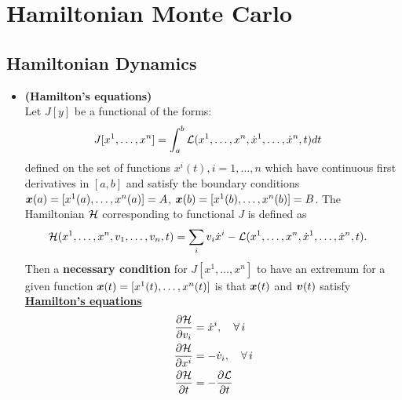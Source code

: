 \documentclass[11pt]{article}
\begin{document}
\section{Hamiltonian Monte Carlo}
\subsection{Hamiltonian Dynamics}
\begin{itemize}
\item \begin{theorem} \textbf{(Hamilton's equations)}  \citep{gelfand2000calculus}\\
Let $J[y]$ be a functional of the forms:
\begin{align}
J[x^1, \ldots, x^n] &=\int_{a}^{b}{\mathcal L}(x^1, \ldots, x^n, \dot{x}^1, \ldots, \dot{x}^{n}, t) dt  \label{eqn: lagrangian_functional}
\end{align} defined on the set of functions $x^{i}(t), i=1,\ldots, n$ which have continuous first derivatives in $[a, b]$ and satisfy the boundary conditions $\boldsymbol{x}(a) = [x^{1}(a), \ldots, x^{n}(a)] = A$, $\boldsymbol{x}(b) = [x^{1}(b), \ldots, x^{n}(b)] = B$. The Hamiltonian ${\mathcal H}$ corresponding to functional $J$ is defined as 
\begin{align*}
{\mathcal H}(x^1, \ldots, x^n, v_{1}, \ldots,  v_{n}, t) &= \sum_{i}v_i \dot{x}^{i} -  {\mathcal L}(x^1, \ldots, x^n, \dot{x}^{1}, \ldots,  \dot{x}^{n}, t) .
\end{align*}
Then a \textbf{necessary condition} for $J[x^1, \ldots, x^n]$ to have an extremum for a given function $\boldsymbol{x}(t) = [x^{1}(t), \ldots, x^{n}(t)]$ is that $\boldsymbol{x}(t)$ and $\boldsymbol{v}(t)$ satisfy  \underline{\textbf{Hamilton's equations}}
\begin{align}
\frac{\partial {\mathcal H}}{ \partial v_{i}} &=  \dot{x}^{i}, \quad \forall\,i \label{eqn: Hamilton_equation_1}\\
\frac{\partial {\mathcal H}}{ \partial x^{i}} &=- \dot{v}_{i}, \quad \forall\,i \label{eqn: Hamilton_equation_2}\\
\frac{\partial {\mathcal H}}{ \partial t} &=  - \frac{\partial {\mathcal L}}{ \partial t} \label{eqn: Hamilton_equation_3}
\end{align} 
\end{theorem}


\end{itemize}
\end{document}
